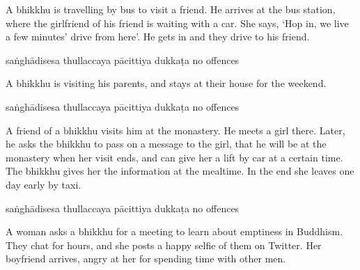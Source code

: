 \begin{exam}{\autoExamName}
\begin{problem*}
\begin{parts}
  \bigskip

\item A bhikkhu is travelling by bus to visit a friend. He arrives at the bus
  station, where the girlfriend of his friend is waiting with a car. She says,
  `Hop in, we live a few minutes' drive from here'. He gets in and they drive to
  his friend.

  \bigskip

  \begin{answers}{5}
    \bChoices
     saṅghādisesa\eAns
     thullaccaya\eAns
     pācittiya\eAns
     dukkaṭa\eAns
     no offences\eAns
    \eChoices
  \end{answers}

  \bigskip

\item A bhikkhu is visiting his parents, and stays at their house for the weekend.

  \bigskip

  \begin{answers}{5}
    \bChoices
     saṅghādisesa\eAns
     thullaccaya\eAns
     pācittiya\eAns
     dukkaṭa\eAns
     no offences\eAns
    \eChoices
  \end{answers}

  \bigskip

\item A friend of a bhikkhu visits him at the monastery. He meets a girl there.
  Later, he asks the bhikkhu to pass on a message to the girl, that he will be
  at the monastery when her visit ends, and can give her a lift by car at a
  certain time. The bhikkhu gives her the information at the mealtime. In the
  end she leaves one day early by taxi. 

  \bigskip

  \begin{answers}{5}
    \bChoices
     saṅghādisesa\eAns
     thullaccaya\eAns
     pācittiya\eAns
     dukkaṭa\eAns
     no offences\eAns
    \eChoices
  \end{answers}

  \bigskip

\item A woman asks a bhikkhu for a meeting to learn about emptiness in Buddhism.
  They chat for hours, and she posts a happy selfie of them on Twitter. Her
  boyfriend arrives, angry at her for spending time with other men.

  \bigskip


\end{parts}
\end{problem*}
\end{exam}
